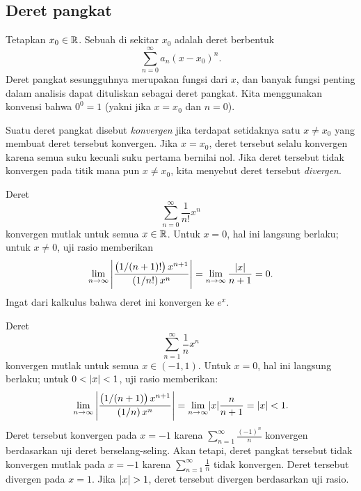 \subsection{Deret pangkat}

Tetapkan $x_0 \in {\mathbb{R}}$.
Sebuah \emph{} di sekitar $x_0$
adalah deret berbentuk
\begin{equation*}
\sum_{n=0}^\infty a_n {(x-x_0)}^n .
\end{equation*}
Deret pangkat sesungguhnya merupakan fungsi dari $x$, dan
banyak fungsi penting dalam analisis dapat dituliskan
sebagai deret pangkat.  Kita menggunakan konvensi bahwa
$0^0 = 1$ (yakni jika $x=x_0$ dan $n=0$).

Suatu deret pangkat disebut
\emph{konvergen} jika
terdapat setidaknya satu $x \neq x_0$ yang membuat deret tersebut konvergen.
Jika $x=x_0$, deret tersebut selalu
konvergen karena semua suku kecuali suku pertama bernilai nol.
Jika deret tersebut tidak konvergen pada titik mana pun $x \neq x_0$, kita menyebut
deret tersebut \emph{divergen}.

\begin{example} \label{ps:expex}
Deret
\begin{equation*}
\sum_{n=0}^\infty \frac{1}{n!} x^n
\end{equation*}
konvergen mutlak untuk semua $x \in {\mathbb{R}}$.  Untuk $x=0$, hal ini langsung berlaku;
untuk $x \neq 0$, uji rasio memberikan
\begin{equation*}
\lim_{n \to \infty}
\left\lvert {\frac{\bigl(1/(n+1)!\bigr) \, x^{n+1}}{(1/n!) \, x^{n}}} \right\rvert
=
\lim_{n \to \infty}
\frac{\lvert {x} \rvert}{n+1}
=
0.
\end{equation*}
Ingat dari kalkulus bahwa deret ini konvergen ke $e^x$.
\end{example}

\begin{example} \label{ps:1kex}
Deret
\begin{equation*}
\sum_{n=1}^\infty \frac{1}{n} x^n
\end{equation*}
konvergen mutlak untuk semua $x \in (-1,1)$.  Untuk $x=0$, hal ini langsung berlaku; untuk $0 < \lvert {x} \rvert < 1$, uji rasio memberikan:
\begin{equation*}
\lim_{n \to \infty}
\left\lvert {
\frac{\bigl(1/(n+1) \bigr) \, x^{n+1}}{(1/n) \, x^{n}}
} \right\rvert
=
\lim_{n \to \infty}
\lvert {x} \rvert \frac{n}{n+1}
=
\lvert {x} \rvert < 1 .
\end{equation*}
Deret tersebut konvergen pada $x=-1$ karena
$\sum_{n=1}^\infty \frac{{(-1)}^n}{n}$ konvergen
berdasarkan uji deret
berselang-seling.
Akan tetapi, deret pangkat tersebut tidak konvergen mutlak pada $x=-1$ karena
$\sum_{n=1}^\infty \frac{1}{n}$ tidak konvergen.
Deret tersebut
divergen pada $x=1$.
Jika $\lvert {x} \rvert > 1$, deret tersebut divergen berdasarkan uji rasio.
\end{example}

